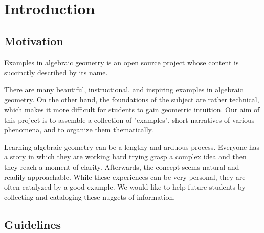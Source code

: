 \chapter{Introduction}

\section{Motivation}

Examples in algebraic geometry is an open source project whose content is succinctly described by its name.

There are many beautiful, instructional, and inspiring examples in algebraic geometry. On the other hand, the foundations of the subject are rather technical, which makes it more difficult for students to gain geometric intuition. Our aim of this project is to assemble a collection of "examples", short narratives of various phenomena, and to organize them thematically.

Learning algebraic geometry can be a lengthy and arduous process. Everyone has a story in which they are working hard trying grasp a complex idea and then they reach a moment of clarity. Afterwards, the concept seems natural and readily approachable. While these experiences can be very personal, they are often catalyzed by a good example. We would like to help future students by collecting and cataloging these nuggets of information.

\section{Guidelines}

